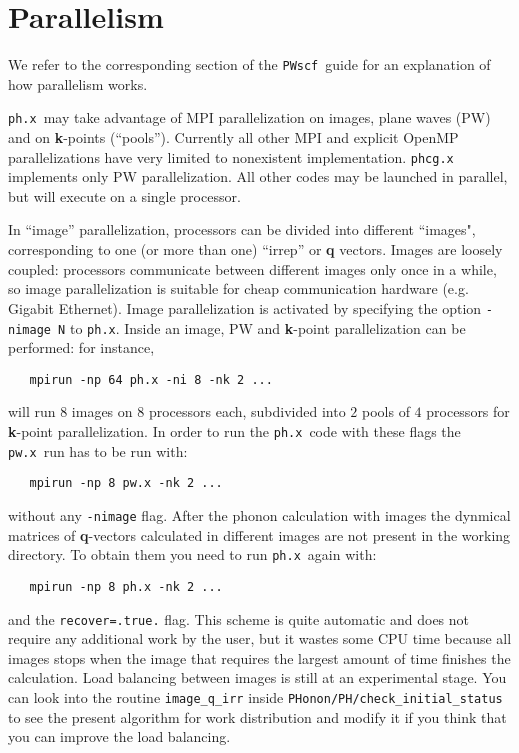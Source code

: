 \documentclass[12pt,a4paper]{article}
\def\pwx{\texttt{pw.x}}
\def\phx{\texttt{ph.x}}
\def\PWscf{\texttt{PWscf}}
\begin{document}
\section{Parallelism}
\label{Sec:para}

We refer to the corresponding section of the \PWscf\ guide for
an explanation of how parallelism works. 

\phx\ may take advantage of MPI parallelization on images, plane waves (PW) 
and on {\bf k}-points (``pools''). Currently all other MPI and explicit 
OpenMP parallelizations have very limited to nonexistent implementation.
\texttt{phcg.x} implements only PW parallelization.
All other codes may be launched in parallel, but will execute 
on a single processor.

In  ``image'' parallelization, processors can be divided into different 
``images", corresponding to one (or more than one) ``irrep'' or {\bf q}
vectors. Images are loosely coupled: processors communicate
between different images only once in a while, so image parallelization
is suitable for cheap communication hardware (e.g. Gigabit Ethernet).
Image parallelization is activated by specifying the option 
\texttt{-nimage N} to \phx. Inside an image, PW and {\bf k}-point 
parallelization can be performed: for instance,
\begin{verbatim}
   mpirun -np 64 ph.x -ni 8 -nk 2 ...
\end{verbatim}
will run $8$ images on $8$ processors each, subdivided into $2$ pools 
of $4$ processors for {\bf k}-point parallelization. In order 
to run the \phx\ code with these flags the \pwx\ run has to be run with:
\begin{verbatim}
   mpirun -np 8 pw.x -nk 2 ...
\end{verbatim}
without any {\tt -nimage} flag. 
After the phonon calculation with images the dynmical matrices of 
{\bf q}-vectors calculated in different images are not present in the
working directory. To obtain them you need to run 
\phx\ again with:
\begin{verbatim}
   mpirun -np 8 ph.x -nk 2 ...
\end{verbatim}
and the {\tt recover=.true.} flag. This scheme is quite automatic and
does not require any additional work by the user, but it wastes some 
CPU time because all images stops when the image that requires the 
largest amount of time finishes the calculation. Load balancing 
between images is still at
an experimental stage. You can look into the routine {\tt image\_q\_irr} 
inside {\tt PHonon/PH/check\_initial\_status} to see the present
algorithm for work distribution and modify it if you think that
you can improve the load balancing.
\end{document}
